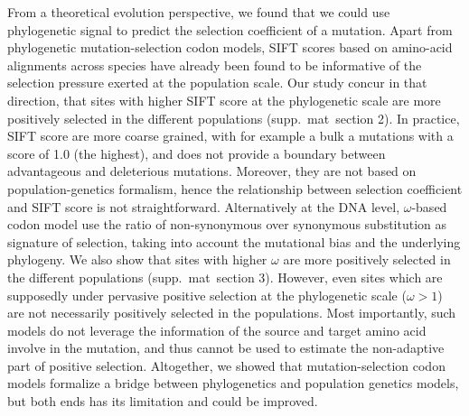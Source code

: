 \documentclass{article}
\begin{document}
    From a theoretical evolution perspective, we found that we could use phylogenetic signal to predict the selection coefficient of a mutation.
    Apart from phylogenetic mutation-selection codon models, SIFT scores based on amino-acid alignments across species have already been found to be informative of the selection pressure exerted at the population scale\cite{chen_hunting_2021}.
    Our study concur in that direction, that sites with higher SIFT score at the phylogenetic scale are more positively selected in the different populations (supp.\ mat\  section 2).
    In practice, SIFT score are more coarse grained, with for example a bulk a mutations with a score of 1.0 (the highest), and does not provide a boundary between advantageous and deleterious mutations.
    Moreover, they are not based on population-genetics formalism, hence the relationship between selection coefficient and SIFT score is not straightforward.
    Alternatively at the DNA level, $\omega$-based codon model use the ratio of non-synonymous over synonymous substitution as signature of selection\cite{goldman_codonbased_1994, yang_codonsubstitution_2002}, taking into account the mutational bias and the underlying phylogeny.
    We also show that sites with higher $\omega$ are more positively selected in the different populations (supp.\ mat\  section 3).
    However, even sites which are supposedly under pervasive positive selection at the phylogenetic scale ($\omega>1$) are not necessarily positively selected in the populations.
    Most importantly, such models do not leverage the information of the source and target amino acid involve in the mutation, and thus cannot be used to estimate the non-adaptive part of positive selection.
    Altogether, we showed that mutation-selection codon models formalize a bridge between phylogenetics and population genetics models, but both ends has its limitation and could be improved.
\end{document}

